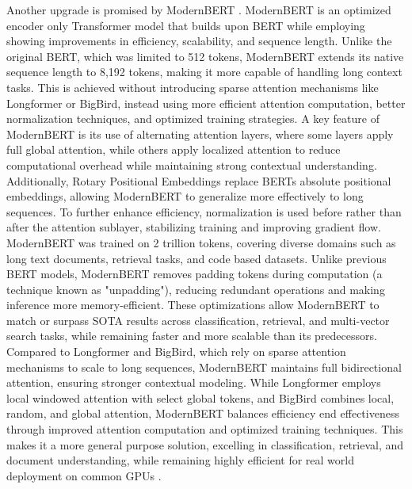 Another upgrade is promised by ModernBERT \cite{modernbert}.
ModernBERT is an optimized encoder only Transformer model that builds upon BERT while employing showing improvements in efficiency, 
scalability, and sequence length. 
Unlike the original BERT, which was limited to 512 tokens, ModernBERT extends its native sequence length to 8,192 tokens, 
making it more capable of handling long context tasks. 
This is achieved without introducing sparse attention mechanisms like Longformer or BigBird, 
instead using more efficient attention computation, better normalization techniques, and optimized training strategies.
A key feature of ModernBERT is its use of alternating attention layers, where some layers apply full global attention, 
while others apply localized attention to reduce computational overhead while maintaining strong contextual understanding. 
Additionally, Rotary Positional Embeddings replace BERTs absolute positional embeddings, 
allowing ModernBERT to generalize more effectively to long sequences. 
To further enhance efficiency, normalization is used before rather than after the attention sublayer, 
stabilizing training and improving gradient flow.
ModernBERT was trained on 2 trillion tokens, 
covering diverse domains such as long text documents, 
retrieval tasks, and code based datasets. 
Unlike previous BERT models, 
ModernBERT removes padding tokens during computation (a technique known as "unpadding"), 
reducing redundant operations and making inference more memory-efficient. 
These optimizations allow ModernBERT to match or surpass SOTA results across classification, retrieval, and multi-vector search tasks, 
while remaining faster and more scalable than its predecessors.
Compared to Longformer and BigBird, which rely on sparse attention mechanisms to scale to long sequences, 
ModernBERT maintains full bidirectional attention, ensuring stronger contextual modeling. 
While Longformer employs local windowed attention with select global tokens, and BigBird combines local, random, and global attention, 
ModernBERT balances efficiency end effectiveness through improved attention 
computation and optimized training techniques. 
This makes it a more general purpose solution, 
excelling in classification, retrieval, 
and document understanding, while remaining highly efficient for real world deployment on common GPUs \cite{modernbert}.

